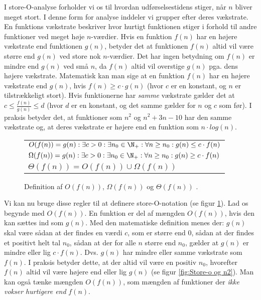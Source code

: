 I store-O-analyse forholder vi os til hvordan udførselsestidens stiger, når $n$ bliver meget stort. I denne form for analyse inddeler vi grupper efter deres vækstrate. En funktions vækstrate beskriver hvor hurtigt funktionen stiger i forhold til andre funktioner ved meget høje $n$-værdier. Hvis en funktion $f(n)$ har en højere vækstrate end funktionen $g(n)$, betyder det at funktionen $f(n)$ altid vil være større end $g(n)$ ved store nok $n$-værdier. Det har ingen betydning om $f(n)$ er mindre end $g(n)$ ved små $n$, da $f(n)$ altid vil overstige $g(n)$ pga. dens højere vækstrate. Matematisk kan man sige at en funktion $f(n)$ har en højere vækstrate end $g(n)$, hvis $f(n) \geq c \cdot g(n)$  (hvor $c$ er en konstant, og $n$ er tilstrækkeligt stort). Hvis funktionerne har \emph{samme} vækstrate gælder det at $c \leq \frac{f(n)}{g(n)} \leq d$ (hvor $d$ er en konstant, og det samme gælder for $n$ og $c$ som før). I praksis betyder det, at funktioner som $n^2$ og $n^2+3n-10$ har den samme vækstrate og, at deres vækstrate er højere end en funktion som $n \cdot log(n)$.\\

\begin{figure}[h]
	\begin{center}
		\padtable
		\begin{tabular}{l}
			\hline
			$O(f(n)) = {g(n): \exists c > 0: \exists n_0 \in \N_+: \forall n \geq n_0: g(n) \leq c \cdot f(n)}$\\
			$\Omega (f(n)) = {g(n): \exists c > 0: \exists n_0 \in \N_+: \forall n \geq n_0: g(n) \geq c \cdot f(n)}$\\
			$\Theta (f(n)) = O(f(n)) \cup \Omega (f(n))$\\
			\hline
		\end{tabular}
	\end{center}
	\caption{Definition af $O(f(n))$, $\Omega (f(n))$ og $\Theta (f(n))$ \cite[s. 26]{aogd}.}
	\label{fig:Store-O definition}
\end{figure}

Vi kan nu bruge disse regler til at definere store-O-notation (se figur \ref{fig:Store-O definition}). Lad os begynde med $O(f(n))$. En funktion er del af mængden $O(f(n))$, hvis den kan sættes ind som $g(n)$. Med den matematiske definition menes der: $g(n)$ skal være sådan at der findes en værdi $c$, som er større end $0$, sådan at der findes et positivt helt tal $n_0$, sådan at der for alle $n$ større end $n_0$, gælder at $g(n)$ er mindre eller lig $c \cdot f(n)$. Dvs. $g(n)$ har mindre eller samme vækstrate som $f(n)$. I praksis betyder dette, at der altid vil være en positiv $n_0$, hvorefter $f(n)$ altid vil være højere end eller lig $g(n)$ (se figur \ref{fig:Store-o og n2}). Man kan også tænke mængden $O(f(n))$, som mængden af funktioner der \emph{ikke vokser hurtigere end} $f(n)$.\\

